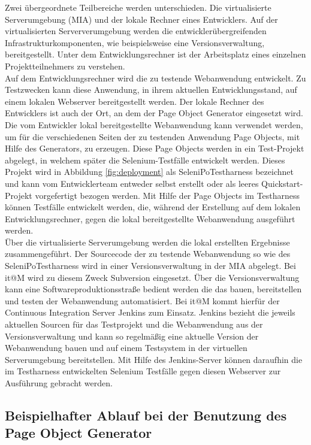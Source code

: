 Zwei übergeordnete Teilbereiche werden unterschieden. Die virtualisierte Serverumgebung (MIA) und der lokale Rechner eines Entwicklers. Auf der virtualisierten Serververumgebung werden die entwicklerübergreifenden Infrastrukturkomponenten, wie beispielsweise eine Versionsverwaltung, bereitgestellt. Unter dem Entwicklungsrechner ist der Arbeitsplatz eines einzelnen Projektteilnehmers zu verstehen.\\
Auf dem Entwicklungsrechner wird die zu testende Webanwendung entwickelt. Zu Testzwecken kann diese Anwendung, in ihrem aktuellen Entwicklungsstand, auf einem lokalen Webserver bereitgestellt werden.
Der lokale Rechner des Entwicklers ist auch der Ort, an dem der Page Object Generator eingesetzt wird. Die vom Entwickler lokal bereitgestellte Webanwendung kann verwendet werden, um für die verschiedenen Seiten der zu testenden Anwendung Page Objects, mit Hilfe des Generators, zu erzeugen. Diese Page Objects werden in ein Test-Projekt abgelegt, in welchem später die Selenium-Testfälle entwickelt werden. Dieses Projekt wird in Abbildung \ref{fig:deployment} als SeleniPoTestharness bezeichnet und kann vom Entwicklerteam entweder selbst erstellt oder als leeres Quickstart-Projekt vorgefertigt bezogen werden. Mit Hilfe der Page Objects im Testharness können Testfälle entwickelt werden, die, während der Erstellung auf dem lokalen Entwicklungsrechner, gegen die lokal bereitgestellte Webanwendung ausgeführt werden.\\
Über die virtualisierte Serverumgebung werden die lokal erstellten Ergebnisse zusammengeführt. 
Der Sourcecode der zu testende Webanwendung so wie des SeleniPoTestharness wird in einer Versionsverwaltung in der MIA abgelegt. Bei it@M wird zu diesem Zweck Subversion eingesetzt. Über die Versionsverwaltung kann eine Softwareproduktionsstraße bedient werden die das bauen, bereitstellen und testen der Webanwendung automatisiert. Bei it@M kommt hierfür der Continuous Integration Server Jenkins zum Einsatz. Jenkins bezieht die jeweils aktuellen Sourcen für das Testprojekt und die Webanwendung aus der Versionsverwaltung und kann so regelmäßig eine aktuelle Version der Webanwendung bauen und auf einem Testsystem in der virtuellen Serverumgebung bereitstellen. Mit Hilfe des Jenkins-Server können daraufhin die im Testharness entwickelten Selenium Testfälle gegen diesen Webserver zur Ausführung gebracht werden.



\subsection{Beispielhafter Ablauf bei der Benutzung des Page Object Generator}
\label{sec:moeglicher_ablauf_eines_standartanwendungsfall}

